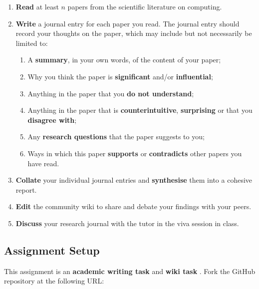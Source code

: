 \documentclass{../fal_assignment}
\begin{document}
\begin{enumerate}[label=\Alph*.]
    \item \textbf{Read} at least $n$ papers from the scientific literature on computing.
    \item \textbf{Write} a journal entry for each paper you read. The journal entry should record your thoughts on the paper,
    	which may include but not necessarily be limited to: 
    	\begin{enumerate}[label=\roman*.]
    		\item A \textbf{summary}, in your own words, of the content of your paper;
    		\item Why you think the paper is \textbf{significant} and/or \textbf{influential};
    		\item Anything in the paper that you \textbf{do not understand};
    		\item Anything in the paper that is \textbf{counterintuitive}, \textbf{surprising} or that you \textbf{disagree with};
    		\item Any \textbf{research questions} that the paper suggests to you;
    		\item Ways in which this paper \textbf{supports} or \textbf{contradicts} other papers you have read.
    	\end{enumerate}
    \item \textbf{Collate} your individual journal entries and \textbf{synthesise} them into a cohesive report. 
    \item \textbf{Edit} the community wiki to share and debate your findings with your peers.
    \item \textbf{Discuss} your research journal with the tutor in the viva session in class.
\end{enumerate}

\subsection*{Assignment Setup}

This assignment is an \textbf{academic writing task} and \textbf{wiki task} . Fork the GitHub repository at the following URL:
\end{document}
